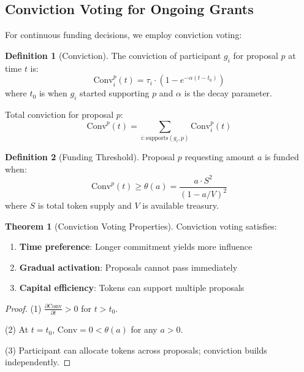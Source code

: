 \documentclass[11pt,a4paper]{article}
\theoremstyle{definition}
\newtheorem{definition}{Definition}[section]
\newtheorem{theorem}{Theorem}[section]
\theoremstyle{remark}
\begin{document}
\subsection{Conviction Voting for Ongoing Grants}

For continuous funding decisions, we employ conviction voting:

\begin{definition}[Conviction]
The conviction of participant $g_i$ for proposal $p$ at time $t$ is:
\begin{equation}
    \text{Conv}_i^p(t) = \tau_i \cdot \left(1 - e^{-\alpha (t - t_0)}\right)
\end{equation}
where $t_0$ is when $g_i$ started supporting $p$ and $\alpha$ is the decay parameter.
\end{definition}

Total conviction for proposal $p$:
\begin{equation}
    \text{Conv}^p(t) = \sum_{i: \text{supports}(g_i, p)} \text{Conv}_i^p(t)
\end{equation}

\begin{definition}[Funding Threshold]
Proposal $p$ requesting amount $a$ is funded when:
\begin{equation}
    \text{Conv}^p(t) \geq \theta(a) = \frac{a \cdot S^2}{(1 - a/V)^2}
\end{equation}
where $S$ is total token supply and $V$ is available treasury.
\end{definition}

\begin{theorem}[Conviction Voting Properties]
Conviction voting satisfies:
\begin{enumerate}
    \item \textbf{Time preference}: Longer commitment yields more influence
    \item \textbf{Gradual activation}: Proposals cannot pass immediately
    \item \textbf{Capital efficiency}: Tokens can support multiple proposals
\end{enumerate}
\end{theorem}

\begin{proof}
(1) $\frac{\partial \text{Conv}}{\partial t} > 0$ for $t > t_0$.

(2) At $t = t_0$, $\text{Conv} = 0 < \theta(a)$ for any $a > 0$.

(3) Participant can allocate tokens across proposals; conviction builds independently.
\end{proof}
\end{document}
